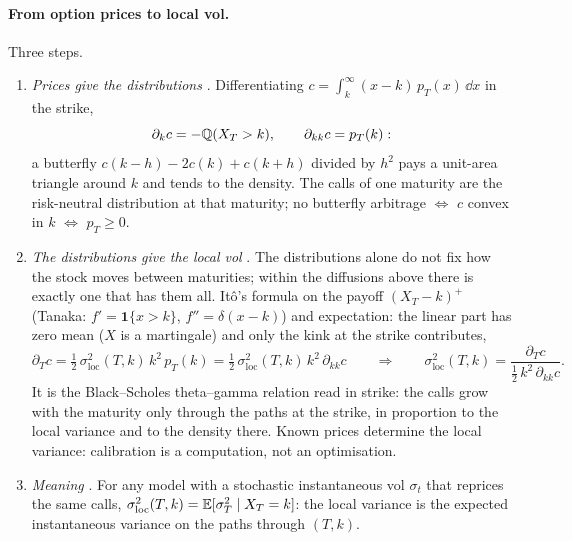\paragraph{From option prices to local vol.} Three steps.
\begin{enumerate}[nosep, label=(\Alph*)]
  \item \emph{Prices give the distributions} \citep{breeden1978}. Differentiating $c = \int_k^\infty (x - k)\,p_T(x)\,\dd x$ in the strike,
        \[
          \partial_k c = -\mathbb{Q}(X_T > k),\qquad \partial_{kk} c = p_T(k):
        \]
        a butterfly $c(k-h) - 2c(k) + c(k+h)$ divided by $h^2$ pays a unit-area triangle around $k$ and tends to the density.
        The calls of one maturity are the risk-neutral distribution at that maturity; no butterfly arbitrage $\Leftrightarrow$
        $c$ convex in $k$ $\Leftrightarrow$ $p_T \ge 0$.
  \item \emph{The distributions give the local vol} \citep{dupire1994}. The distributions alone do not fix how the stock moves
        between maturities; within the diffusions above there is exactly one that has them all. Itô's formula on the
        payoff $(X_T - k)^+$ (Tanaka: $f' = \mathbf 1\{x > k\}$, $f'' = \delta(x - k)$) and expectation: the linear part has zero
        mean ($X$ is a martingale) and only the kink at the strike contributes,
        \[
          \partial_T c = \tfrac12\,\sigma_{\mathrm{loc}}^2(T, k)\,k^2\,p_T(k) = \tfrac12\,\sigma_{\mathrm{loc}}^2(T, k)\,k^2\,\partial_{kk} c
          \qquad\Longrightarrow\qquad
          \sigma_{\mathrm{loc}}^2(T, k) = \frac{\partial_T c}{\tfrac12\,k^2\,\partial_{kk} c} .
        \]
        It is the Black--Scholes theta--gamma relation read in strike: the calls grow with the maturity only through the
        paths at the strike, in proportion to the local variance and to the density there. Known prices determine the
        local variance: calibration is a computation, not an optimisation.
  \item \emph{Meaning} \citep{gyongy1986,derman1994}. For any model with a stochastic instantaneous vol $\sigma_t$ that reprices the
        same calls, $\sigma_{\mathrm{loc}}^2(T, k) = \mathbb{E}[\sigma_T^2 \mid X_T = k]$: the local variance is the expected instantaneous variance
        on the paths through $(T, k)$.
\end{enumerate}

